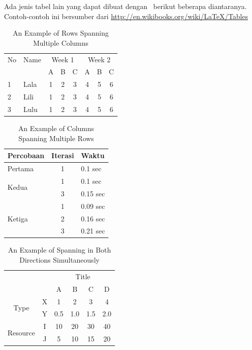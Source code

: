 Ada jenis tabel lain yang dapat dibuat dengan \latex~berikut beberapa diantaranya.
Contoh-contoh ini bersumber dari \url{http://en.wikibooks.org/wiki/LaTeX/Tables}

\begin{table}
	\centering
	\caption{An Example of Rows Spanning Multiple Columns}
	\label{row.spanning}
	\begin{tabular}{|l|l|*{6}{c|}}
		No & Name & \multicolumn{3}{|c|}{Week 1} & \multicolumn{3}{|c|}{Week 2} \\
		& & A & B & C & A & B & C\\
		\hline
		1 & Lala & 1 & 2 & 3 & 4 & 5 & 6\\
		2 & Lili & 1 & 2 & 3 & 4 & 5 & 6\\
		3 & Lulu & 1 & 2 & 3 & 4 & 5 & 6\\
		\hline
	\end{tabular}
\end{table}

\begin{table}
	\centering
	\caption{An Example of Columns Spanning Multiple Rows}
	\label{column.spanning}
	\begin{tabular}{|l|c|l|}
		\hline
		Percobaan & Iterasi & Waktu \\
		\hline
		Pertama & 1 & 0.1 sec \\ \hline
		\multirow{2}{*}{Kedua} & 1 & 0.1 sec \\
		& 3 & 0.15 sec \\
		\hline
		\multirow{3}{*}{Ketiga} & 1 & 0.09 sec \\
		& 2 & 0.16 sec \\
		& 3 & 0.21 sec \\
		\hline
	\end{tabular}
\end{table}

\begin{table}
	\centering
	\caption{An Example of Spanning in Both Directions Simultaneously}
	\label{mix.spanning}
	\begin{tabular}{cc|c|c|c|c|}
		\cline{3-6}
		& & \multicolumn{4}{|c|}{Title} \\ \cline{3-6}
		& & A & B & C & D \\ \hline
		\multicolumn{1}{|c|}{\multirow{2}{*}{Type}} &
		\multicolumn{1}{|c|}{X} & 1 & 2 & 3 & 4\\ \cline{2-6}
		\multicolumn{1}{|c|}{}                        &
		\multicolumn{1}{|c|}{Y} & 0.5 & 1.0 & 1.5 & 2.0\\ \cline{1-6}
		\multicolumn{1}{|c|}{\multirow{2}{*}{Resource}} &
		\multicolumn{1}{|c|}{I} & 10 & 20 & 30 & 40\\ \cline{2-6}
		\multicolumn{1}{|c|}{}                        &
		\multicolumn{1}{|c|}{J} & 5 & 10 & 15 & 20\\ \cline{1-6}
	\end{tabular}
\end{table}


